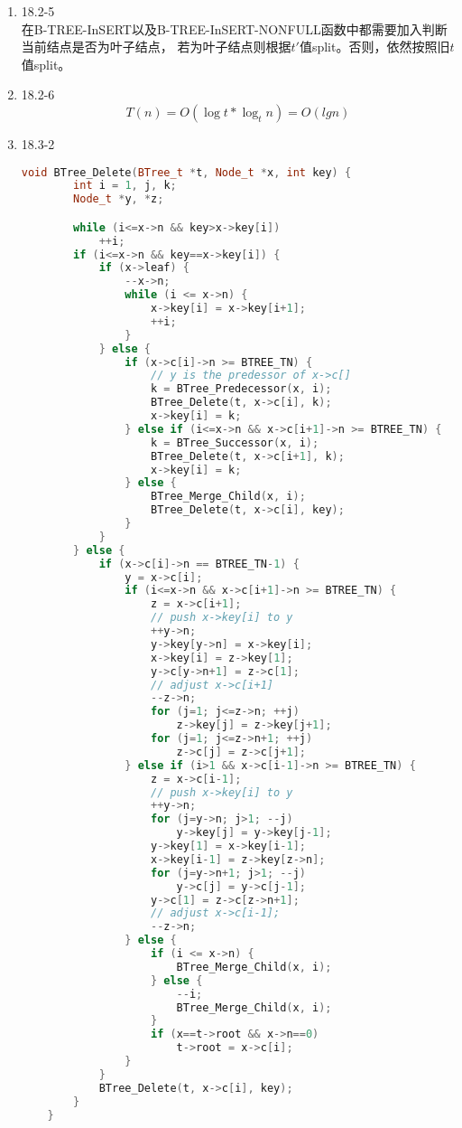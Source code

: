 \documentclass[UTF8]{ctexart}
\begin{document}
\begin{enumerate}
	\item 18.2-5 \\
	在B-TREE-InSERT以及B-TREE-InSERT-NONFULL函数中都需要加入判断当前结点是否为叶子结点，
	若为叶子结点则根据$t'$值split。否则，依然按照旧$t$值split。
	
	\item 18.2-6 \\
	\[
		T(n) = O(\log t*\log_t n) = O(lgn)
	\]
	
	\item 18.3-2 \\
	\begin{lstlisting}[language=c++]
	void BTree_Delete(BTree_t *t, Node_t *x, int key) {
		int i = 1, j, k;
		Node_t *y, *z;

		while (i<=x->n && key>x->key[i])
			++i;
		if (i<=x->n && key==x->key[i]) {
			if (x->leaf) {
				--x->n;
				while (i <= x->n) {
					x->key[i] = x->key[i+1];
					++i;
				}
			} else {
				if (x->c[i]->n >= BTREE_TN) {
					// y is the predessor of x->c[]
					k = BTree_Predecessor(x, i);
					BTree_Delete(t, x->c[i], k);
					x->key[i] = k;
				} else if (i<=x->n && x->c[i+1]->n >= BTREE_TN) {
					k = BTree_Successor(x, i);
					BTree_Delete(t, x->c[i+1], k);
					x->key[i] = k;
				} else {
					BTree_Merge_Child(x, i);
					BTree_Delete(t, x->c[i], key);
				}
			}
		} else {
			if (x->c[i]->n == BTREE_TN-1) {
				y = x->c[i];
				if (i<=x->n && x->c[i+1]->n >= BTREE_TN) {
					z = x->c[i+1];
					// push x->key[i] to y
					++y->n;
					y->key[y->n] = x->key[i];
					x->key[i] = z->key[1];
					y->c[y->n+1] = z->c[1];
					// adjust x->c[i+1]
					--z->n;
					for (j=1; j<=z->n; ++j)
						z->key[j] = z->key[j+1];
					for (j=1; j<=z->n+1; ++j)
						z->c[j] = z->c[j+1];
				} else if (i>1 && x->c[i-1]->n >= BTREE_TN) {
					z = x->c[i-1];
					// push x->key[i] to y
					++y->n;
					for (j=y->n; j>1; --j)
						y->key[j] = y->key[j-1];
					y->key[1] = x->key[i-1];
					x->key[i-1] = z->key[z->n];
					for (j=y->n+1; j>1; --j)
						y->c[j] = y->c[j-1];
					y->c[1] = z->c[z->n+1];
					// adjust x->c[i-1];
					--z->n;
				} else {
					if (i <= x->n) {
						BTree_Merge_Child(x, i);
					} else {
						--i;
						BTree_Merge_Child(x, i);
					}
					if (x==t->root && x->n==0)
						t->root = x->c[i];
				}
			}
			BTree_Delete(t, x->c[i], key);
		}
	}	
	\end{lstlisting}
	
\end{enumerate}
\end{document}
